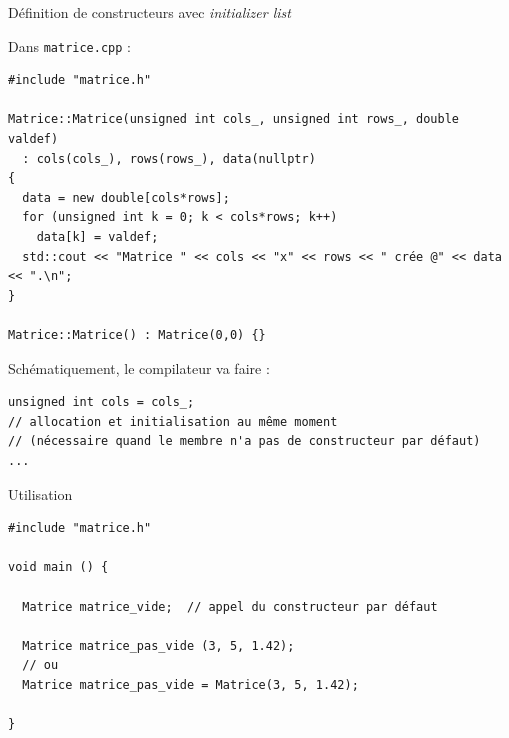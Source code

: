\documentclass[c]{beamer}
\begin{document}
\begin{frame}[fragile]{Définition de constructeurs avec \textit{initializer list}}

Dans \texttt{matrice.cpp} :

\begin{verbatim}
#include "matrice.h"

Matrice::Matrice(unsigned int cols_, unsigned int rows_, double valdef) 
  : cols(cols_), rows(rows_), data(nullptr)
{
  data = new double[cols*rows];
  for (unsigned int k = 0; k < cols*rows; k++)
    data[k] = valdef;
  std::cout << "Matrice " << cols << "x" << rows << " crée @" << data << ".\n";
}

Matrice::Matrice() : Matrice(0,0) {}
\end{verbatim}

\vspace{1em}
Schématiquement, le compilateur va faire :
\begin{verbatim}
unsigned int cols = cols_;
// allocation et initialisation au même moment
// (nécessaire quand le membre n'a pas de constructeur par défaut)
...
\end{verbatim}

\end{frame}


\begin{frame}[fragile]{Utilisation}
\begin{verbatim}
#include "matrice.h"

void main () {

  Matrice matrice_vide;  // appel du constructeur par défaut

  Matrice matrice_pas_vide (3, 5, 1.42);
  // ou
  Matrice matrice_pas_vide = Matrice(3, 5, 1.42);

}
\end{verbatim}
\end{frame}

\end{document}

